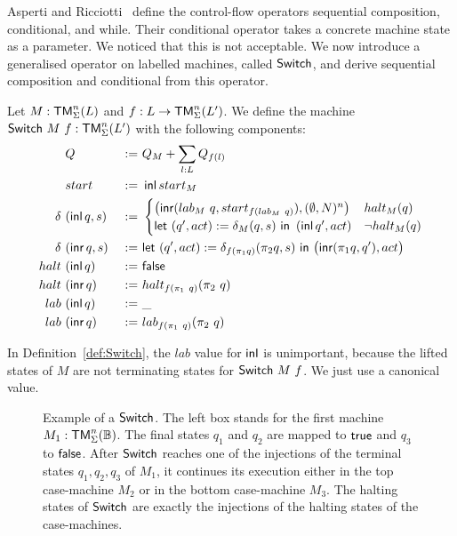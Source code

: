 Asperti and Ricciotti~\cite{asperti2015} define the control-flow operators sequential composition, conditional, and while.  Their conditional operator
takes a concrete machine state as a parameter.  We noticed that this is not acceptable.  We now introduce a generalised operator on labelled machines,
called $\mathsf{Switch}$, and derive sequential composition and conditional from this operator.

\begin{definition}[$\MS{Switch}~M~f$][Switch]
  \label{def:Switch}
  Let $M : \mathsf{TM}_\Sigma^n(L)$ and $f : L \rightarrow \mathsf{TM}_\Sigma^n(L')$.  We define the machine $\mathsf{Switch}~M~f : \mathsf{TM}_\Sigma^n(L')$ with the following
  components:
  \begin{alignat*}{3}
    & Q                  &~:=~& Q_M +  \sum_{l:L} Q_{f(l)} \\
    & start              &~:=~& \operatorname{\mathsf{inl}} start_M \\
    \delta ~&(\operatorname{\mathsf{inl}} q, s) &~:=~&
    \begin{cases}
      \bigl(\operatorname{\mathsf{inr}} (lab_M~q, start_{f (lab_M~q)}), (\emptyset, N)^n \bigr) & halt_M(q) \\
      \mathsf{let}~(q', act) := \delta_M(q, s)~\mathsf{in}~\left(\operatorname{\mathsf{inl}} q', act \right) & \lnot halt_M(q)
    \end{cases} \\
    \delta ~&(\operatorname{\mathsf{inr}} q, s) &~:=~& \mathsf{let}~(q', act) := \delta_{f(\pi_1 q)} (\pi_2 q, s)~\mathsf{in}~\bigl( \operatorname{\mathsf{inr}} (\pi_1 q, q'), act \bigr) \\
    halt   ~&(\operatorname{\mathsf{inl}}  q)   &~:=~& \mathsf{false} \\
    halt   ~&(\operatorname{\mathsf{inr}}  q)   &~:=~& halt_{f(\pi_1~q)} (\pi_2~q) \\
    lab   ~&(\operatorname{\mathsf{inl}}  q)   &~:=~& \_ \\
    lab   ~&(\operatorname{\mathsf{inr}}  q)   &~:=~& lab_{f(\pi_1~q)} (\pi_2~q)
  \end{alignat*}
\end{definition}

In Definition~\ref{def:Switch}, the $lab$ value for $\operatorname{\mathsf{inl}}$ is unimportant, because the lifted states of $M$ are not terminating states for
$\MS{Switch}~M~f$.  We just use a canonical value.

\begin{figure}
  \center
  
  \caption{Example of a $\mathsf{Switch}$.  The left box stands for the first machine $M_1:\mathsf{TM}_\Sigma^n(\mathbb{B})$.  The final states $q_1$ and $q_2$ are
    mapped to $\mathsf{true}$ and $q_3$ to $\mathsf{false}$.  After $\mathsf{Switch}$ reaches one of the injections of the terminal states $q_1, q_2, q_3$ of $M_1$, it
    continues its execution either in the top case-machine $M_2$ or in the bottom case-machine $M_3$.  The halting states of $\mathsf{Switch}$ are exactly
    the injections of the halting states of the case-machines.}
  \label{fig:match}
\end{figure}

